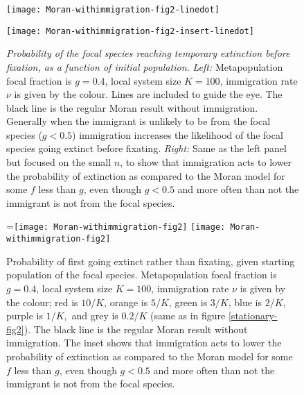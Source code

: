 \begin{figure}[h]
	\centering
	\begin{minipage}{0.49\linewidth}
		\centering
		\texttt{[image: Moran-withimmigration-fig2-linedot]}
	\end{minipage}
	\begin{minipage}{0.49\linewidth}
		\centering
		\texttt{[image: Moran-withimmigration-fig2-insert-linedot]}
	\end{minipage}
	\caption{\emph{Probability of the focal species reaching temporary extinction before fixation, as a function of initial population.}
		\emph{Left:} Metapopulation focal fraction is $g=0.4$, local system size $K=100$, immigration rate $\nu$ is given by the colour. Lines are included to guide the eye. The black line is the regular Moran result without immigration. Generally when the immigrant is unlikely to be from the focal species ($g<0.5$) immigration increases the likelihood of the focal species going extinct before fixating. %
		\emph{Right:} Same as the left panel but focused on the small $n$, to show that immigration acts to lower the probability of extinction as compared to the Moran model for some $f$ less than $g$, even though $g<0.5$ and more often than not the immigrant is not from the focal species. 
	} \label{extnprobfig-ihope}
\end{figure}
\iffalse
\begin{figure}[ht]
	\centering
	=\hbox{\texttt{[image: Moran-withimmigration-fig2]}}
	\texttt{[image: Moran-withimmigration-fig2]}
	\caption{Probability of first going extinct rather than fixating, given starting population of the focal species. Metapopulation focal fraction is $g=0.4$, local system size $K=100$, immigration rate $\nu$ is given by the colour; red is $10/K$, orange is $5/K$, green is $3/K$, blue is $2/K$, purple is $1/K,$ and grey is $0.2/K$ (same as in figure \ref{stationary-fig2}). The black line is the regular Moran result without immigration. The inset shows that immigration acts to lower the probability of extinction as compared to the Moran model for some $f$ less than $g$, even though $g<0.5$ and more often than not the immigrant is not from the focal species. } \label{extnprobfig-ihope}
\end{figure}
